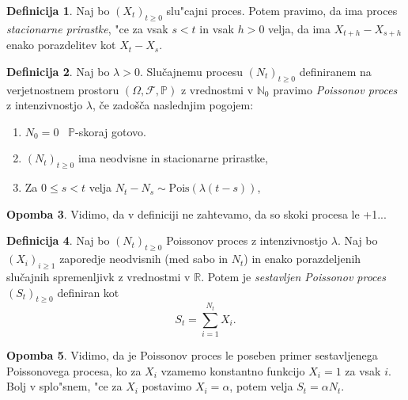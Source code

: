 \documentclass[12pt,a4paper]{amsart}
\theoremstyle{definition} %
\newtheorem{definicija}{Definicija}[section]
\newtheorem{opomba}[definicija]{Opomba}
\theoremstyle{plain} %
\newcommand{\N}{\mathbb{N}}
\newcommand{\Prob}{\mathbb{P}}
\newcommand{\1}{\mathds{1}}
\newcommand{\Pois}[1]{\text{Pois}(#1)}
\begin{document}
    \begin{definicija}
        Naj bo $(X_t)_{t\geq0}$ slu"cajni proces. Potem pravimo, da ima proces
        \textit{stacionarne prirastke}, "ce za vsak $s < t$ in vsak $h > 0$ velja, 
        da ima $X_{t+h} - X_{s+h}$ enako porazdelitev kot $X_t - X_s$.
        \label{def:stacPrir}
    \end{definicija}

    \begin{definicija}
        Naj bo $\lambda > 0$. Slučajnemu procesu $(N_t)_{t\geq 0}$ definiranem na verjetnostnem 
        prostoru $(\Omega, \mathcal{F}, \mathbb{P})$ z vrednostmi v $\N_0$ pravimo 
        \textit{Poissonov proces} z intenzivnostjo $\lambda$, če zadošča naslednjim pogojem:
        \begin{enumerate}
            \item $N_0 = 0$ \ $\Prob$-skoraj gotovo.
            \item $(N_t)_{t\geq 0}$ ima neodvisne in stacionarne prirastke,
            \item Za $0 \leq s < t$ velja $ N_t - N_s \sim\Pois{\lambda(t - s)}$,
        \end{enumerate}
        \label{def:HPP}
    \end{definicija}

    \begin{opomba}
        Vidimo, da v definiciji ne zahtevamo, da so skoki procesa le +1... 
        \label{op:skoki}
    \end{opomba}

    \begin{definicija}
        Naj bo $(N_t)_{t\geq0}$ Poissonov proces z intenzivnostjo $\lambda$. 
        Naj bo $(X_i)_{i\geq1}$ zaporedje neodvisnih (med sabo in $N_t$) in enako 
        porazdeljenih slučajnih spremenljivk z vrednostmi v $\mathbb{R}$. Potem je 
        \textit{sestavljen Poissonov proces} $(S_t)_{t\geq0}$ definiran kot
        $$
            S_t = \sum_{i=1}^{N_t} X_i.
        $$
        \label{def:CPP}
    \end{definicija}

    \begin{opomba}
        Vidimo, da je Poissonov proces le poseben primer sestavljenega Poissonovega procesa, ko za
        $X_i$ vzamemo konstantno funkcijo $X_i = 1$ za vsak $i$. Bolj v splo"snem, "ce za $X_i$ 
        postavimo $X_i = \alpha$, potem velja $S_t = \alpha N_t$.
        \label{op:CPPHPPPovezava}
    \end{opomba}
\end{document}
